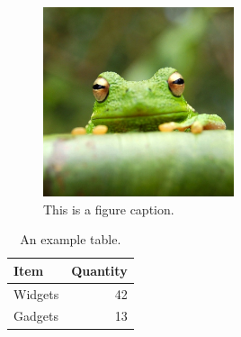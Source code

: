\begin{figure}
\centering
\includegraphics[width=0.5\textwidth]{frog.jpg}
\caption{\label{fig:frog}This is a figure caption.}
\end{figure}

\begin{table}
\centering
\begin{tabular}{l|r}
Item & Quantity \\\hline
Widgets & 42 \\
Gadgets & 13
\end{tabular}
\caption{\label{tab:widgets}An example table.}
\end{table}
